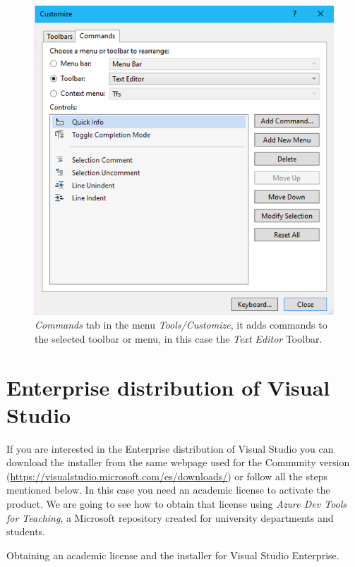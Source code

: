 \begin{figure}[h]
    \centering
    \includegraphics[width= \textwidth]{Figures/Config4-3}
    \caption{\textit{Commands} tab in the menu \textit{Tools/Customize}, it adds commands to the selected toolbar or menu, in this case the \textit{Text Editor} Toolbar.}
    \label{fig:Config4-3}
\end{figure}
    

    
    
    

    \FloatBarrier
    \section{Enterprise distribution of Visual Studio} \label{sec:Enterprise}

If you are interested in the Enterprise distribution of Visual Studio you can download the installer from the same webpage used for the Community version (\url{https://visualstudio.microsoft.com/es/downloads/}) or follow all the steps mentioned below. In this case you need an academic license to activate the product. We are going to see how to obtain that license using \textit{Azure Dev Tools for Teaching}, a Microsoft repository created for university departments and students.

Obtaining an academic license and the installer for Visual Studio Enterprise. 

